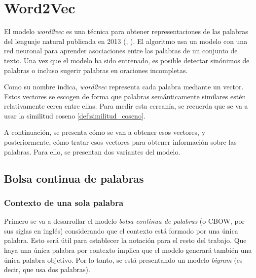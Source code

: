 \chapter{Word2Vec}

El modelo \textit{word2vec} es una técnica para obtener representaciones de las palabras del lenguaje natural publicada en 2013 (\cite{word2vec:1}, \cite{word2vec:2}).
El algoritmo usa un modelo con una red neuronal para aprender asociaciones entre las palabras de un conjunto de texto. Una vez que el modelo ha
sido entrenado, es posible detectar sinónimos de palabras o incluso sugerir palabras en oraciones incompletas.

Como su nombre indica, \textit{word2vec} representa cada palabra mediante un vector. Estos vectores se escogen de forma que palabras semánticamente similares
estén relativamente cerca entre ellas. Para medir esta cercanía, se recuerda que se va a usar la similitud coseno \ref{def:similitud_coseno}.

A continuación, se presenta cómo se van a obtener esos vectores, y posteriormente, cómo tratar esos vectores para obtener información sobre las palabras. Para
ello, se presentan dos variantes del modelo.

\section{Bolsa continua de palabras}

\subsection{Contexto de una sola palabra}

Primero se va a desarrollar el modelo \textit{bolsa continua de palabras} (o CBOW, por sus siglas en inglés) considerando que el contexto está formado por una única palabra.
Esto será útil para establecer la notación para el resto del trabajo. Que haya una única palabra por contexto implica que el modelo generará también una única palabra objetivo.
Por lo tanto, se está presentando un modelo \textit{bigram} (es decir, que usa dos palabras).

